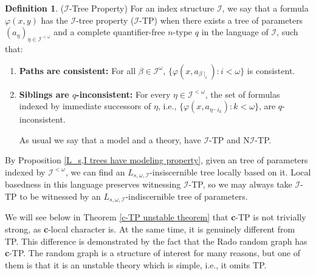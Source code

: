 \documentclass{article}
\newcommand{\calI}{\mathcal{I}}
\newcommand{\qftp}{\text{qftp}}
\newcommand{\vphi}{\varphi}
\theoremstyle{definition}
\newtheorem{definition}{Definition}
\theoremstyle{definition}
\theoremstyle{definition}
\theoremstyle{definition}
\begin{document}
\begin{definition}{($\calI$-Tree Property)}
        For an index structure $\calI$, we say that a formula $\vphi(x,y)$ has the $\calI$-tree property ($\calI$-TP) when there exists a tree of parameters $(a_\eta)_{\eta\in \calI^{<\omega}}$ and a complete quantifier-free $n$-type $q$ in the language of $\calI$, such that:

        \begin{enumerate}
    \item \textbf{Paths are consistent:} For all $\beta\in\calI^{\omega}$, $\{\vphi(x, a_{\beta\mid _i})\colon i<\omega\}$ is consistent.

   \item \textbf{Siblings are $q$-inconsistent:} For every $\eta\in\calI^{<\omega}$, the set of formulas indexed by immediate successors of $\eta$, i.e., $\{\vphi(x,a_{\eta^\smallfrown i_k})\colon k<\omega\}$, are $q$-inconsistent.
   

As usual we say that a model and a theory, have $\calI$-TP and N$\calI$-TP.
\end{enumerate}
\end{definition}

By Proposition \ref{L_s,I trees have modeling property}, given an tree of parameters indexed by $\calI^{<\omega}$, we can find an $L_{s,\omega,\calI}$-insiscernible tree locally based on it. Local basedness in this language preserves witnessing $\calI$-TP, so we may always take $\calI$-TP to be witnessed by an $L_{s,\omega,\calI}$-indiscernible tree of parameters. 

We will see below in Theorem \ref{c-TP unstable theorem} that \textbf{c}-TP is not trivially strong, as \textbf{c}-local character is. At the same time, it is genuinely different from TP. This difference is demonstrated by the fact that the Rado random graph has \textbf{c}-TP. The random graph is a structure of interest for many reasons, but one of them  is that it is an unstable theory which is simple, i.e., it omits TP.
\end{document}
